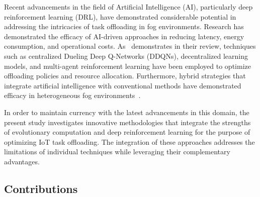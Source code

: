 \documentclass[preprint,3p,authoryear]{elsarticle}
\begin{document}
Recent advancements in the field of Artificial Intelligence (AI), particularly deep reinforcement learning (DRL), have demonstrated considerable potential in addressing the intricacies of task offloading in fog environments. Research has demonstrated the efficacy of AI-driven approaches in reducing latency, energy consumption, and operational costs. As~\cite{fahimullah_review_2022} demonstrates in their review, techniques such as centralized Dueling Deep Q-Networks (DDQNs), decentralized learning models, and multi-agent reinforcement learning have been employed to optimize offloading policies and resource allocation. Furthermore, hybrid strategies that integrate artificial intelligence with conventional methods have demonstrated efficacy in heterogeneous fog environments~\citep{mishra_collaborative_2023}.

In order to maintain currency with the latest advancements in this domain, the present study investigates innovative methodologies that integrate the strengths of evolutionary computation and deep reinforcement learning for the purpose of optimizing IoT task offloading. The integration of these approaches addresses the limitations of individual techniques while leveraging their complementary advantages.


\subsection{Contributions}
\end{document}

